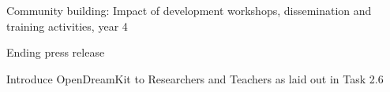\begin{workpackage}
\begin{wpdelivs}
  \begin{wpdeliv}[due=48,miles=eval,id=workshops-4,dissem=PU,nature=R,lead=PS,issue=40]{Community building: Impact of development workshops, dissemination and training activities, year 4}\end{wpdeliv}
  \begin{wpdeliv}[due=48,miles=eval,id=press-release-2,dissem=PU,nature=DEC,lead=PS,issue=41]{Ending press release}\end{wpdeliv}
\begin{wpdeliv}[due=48,miles=eval,id=IntroODK,dissem=PU,nature=DEC,lead=USH,issue=250]{Introduce OpenDreamKit to Researchers and Teachers as laid out in Task 2.6}\end{wpdeliv}
\end{wpdelivs}
\end{workpackage}


